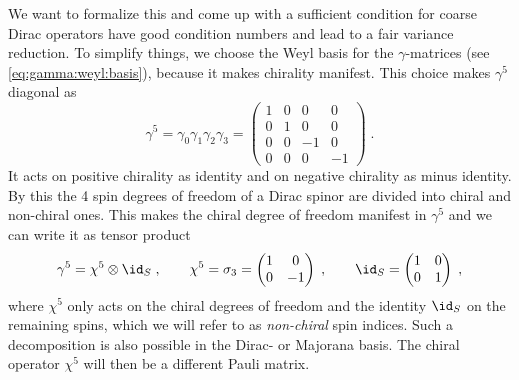 We want to formalize this and come up with a sufficient condition for coarse Dirac operators have good condition numbers and lead to a fair variance reduction.
To simplify things, we choose the Weyl basis for the $\gamma$-matrices (see \cref{eq:gamma:weyl:basis}), because it makes chirality manifest.
This choice makes $\gamma^5$ diagonal as
\begin{equation}
\gamma^5 =
\gamma_0 \gamma_1 \gamma_2 \gamma_3 =
\begin{pmatrix}
1 & 0 & 0 & 0 \\
0 & 1 & 0 & 0 \\
0 & 0 & -1 & 0 \\
0 & 0 & 0 & -1
\end{pmatrix} \;.
\end{equation}
It acts on positive chirality as identity and on negative chirality as minus identity.
By this the \num{4} spin degrees of freedom of a Dirac spinor are divided into chiral and non-chiral ones.
This makes the chiral degree of freedom manifest in $\gamma^5$ and we can write it as tensor product
\begin{equation} \label{eq:strict:separable}
\gamma^5 = \chi^5 \otimes \id_S \;,
\qquad
\chi^5 = 
\sigma_3 = 
\begin{pmatrix}
1 & 0 \\
0 & -1
\end{pmatrix} \;,
\qquad
\id_S = 
\begin{pmatrix}
1 & 0 \\
0 & 1
\end{pmatrix} \;,
\end{equation}
where $\chi^5$ only acts on the chiral degrees of freedom and the identity $\id_S$ on the remaining spins, which we will refer to as \emph{non-chiral} spin indices.
Such a decomposition is also possible in the Dirac- or Majorana basis.
The chiral operator $\chi^5$ will then be a different Pauli matrix.

